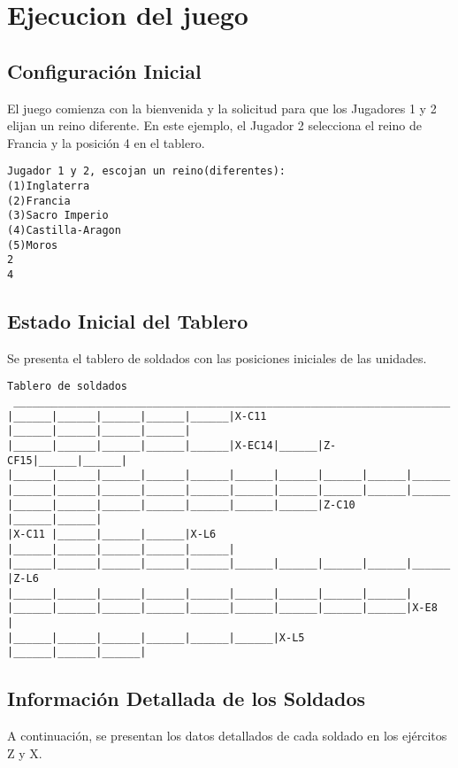 \section{Ejecucion del juego}

\subsection{Configuración Inicial}
El juego comienza con la bienvenida y la solicitud para que los Jugadores 1 y 2 elijan un reino diferente. En este ejemplo, el Jugador 2 selecciona el reino de Francia y la posición 4 en el tablero.

\begin{lstlisting}[language=plaintext]
Jugador 1 y 2, escojan un reino(diferentes):
(1)Inglaterra
(2)Francia
(3)Sacro Imperio
(4)Castilla-Aragon
(5)Moros
2
4
\end{lstlisting}

\subsection{Estado Inicial del Tablero}
Se presenta el tablero de soldados con las posiciones iniciales de las unidades.

\begin{lstlisting}[language=plaintext]
Tablero de soldados
 _____________________________________________________________________
|______|______|______|______|______|X-C11 |______|______|______|______|
|______|______|______|______|______|X-EC14|______|Z-CF15|______|______|
|______|______|______|______|______|______|______|______|______|______|
|______|______|______|______|______|______|______|______|______|______|
|______|______|______|______|______|______|______|Z-C10 |______|______|
|X-C11 |______|______|______|X-L6  |______|______|______|______|______|
|______|______|______|______|______|______|______|______|______|______|
|Z-L6  |______|______|______|______|______|______|______|______|______|
|______|______|______|______|______|______|______|______|______|X-E8  |
|______|______|______|______|______|______|X-L5  |______|______|______|
\end{lstlisting}

\subsection{Información Detallada de los Soldados}
A continuación, se presentan los datos detallados de cada soldado en los ejércitos Z y X.

